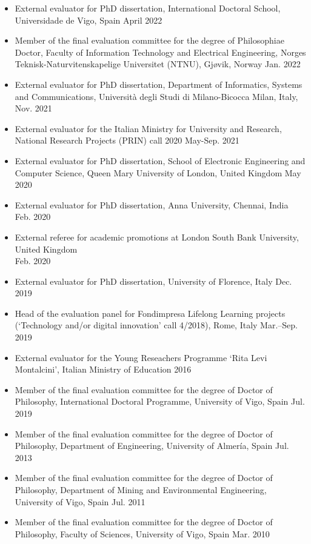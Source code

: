 \documentclass[11pt]{article}
\begin{document}
\begin{itemize}
    \item External evaluator for PhD dissertation, International Doctoral School, Universidade de Vigo, Spain \hfill April 2022
    \item Member of the final evaluation committee for the degree of Philosophiae Doctor, Faculty of Information Technology and Electrical Engineering, Norges Teknisk-Naturvitenskapelige Universitet (NTNU), Gjøvik, Norway \hfill Jan. 2022
    \item External evaluator for PhD dissertation, Department of Informatics, Systems and Communications, Università degli Studi di Milano-Bicocca Milan, Italy, \hfill Nov. 2021
    \item External evaluator for the Italian Ministry for University and Research, National Research Projects (PRIN) call 2020 \hfill May-Sep. 2021
    \item External evaluator for PhD dissertation, School of Electronic Engineering and Computer Science, Queen Mary University of London, United Kingdom \hfill May 2020
    \item External evaluator for PhD dissertation, Anna University, Chennai, India \hfill Feb. 2020
    \item External referee for academic promotions at London South Bank University, United Kingdom \\ \mbox{} \hfill Feb. 2020
    \item External evaluator for PhD dissertation, University of Florence, Italy \hfill Dec. 2019
    \item Head of the evaluation panel for Fondimpresa Lifelong Learning projects (`Technology and/or digital innovation' call 4/2018), Rome, Italy \hfill Mar.--Sep. 2019
    \item External evaluator for the Young Reseachers Programme ‘Rita Levi Montalcini’, Italian Ministry of Education \hfill 2016
    \item Member of the final evaluation committee for the degree of Doctor of Philosophy, International Doctoral Programme, University of Vigo, Spain \hfill Jul. 2019
    \item Member of the final evaluation committee for the degree of Doctor of Philosophy, Department of Engineering, University of Almería, Spain \hfill Jul. 2013
    \item Member of the final evaluation committee for the degree of Doctor of Philosophy, Department of Mining and Environmental Engineering, University of Vigo, Spain \hfill Jul. 2011
    \item Member of the final evaluation committee for the degree of Doctor of Philosophy, Faculty of Sciences, University of Vigo, Spain \hfill Mar. 2010 
\end{itemize}
\end{document}

